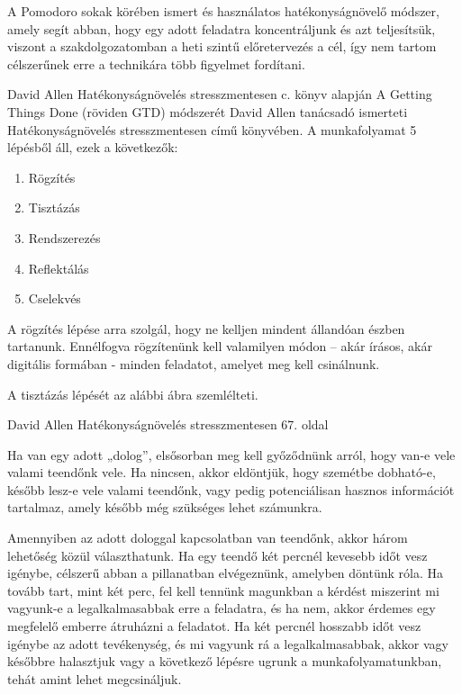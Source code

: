 A Pomodoro sokak körében ismert és használatos hatékonyságnövelő módszer, amely segít abban, hogy egy adott feladatra koncentráljunk és azt teljesítsük, viszont a szakdolgozatomban a heti szintű előretervezés a cél, így nem tartom célszerűnek erre a technikára több figyelmet fordítani.


David Allen Hatékonyságnövelés stresszmentesen c. könyv alapján
A Getting Things Done (röviden GTD) módszerét David Allen tanácsadó ismerteti Hatékonyságnövelés stresszmentesen című könyvében. A munkafolyamat 5 lépésből áll, ezek a következők:
\begin{enumerate}
\item Rögzítés
\item Tisztázás
\item Rendszerezés
\item Reflektálás
\item Cselekvés
\end{enumerate}

A rögzítés lépése arra szolgál, hogy ne kelljen mindent állandóan észben tartanunk. Ennélfogva rögzítenünk kell valamilyen módon – akár írásos, akár digitális formában - minden feladatot, amelyet meg kell csinálnunk.

A tisztázás lépését az alábbi ábra szemlélteti.


David Allen Hatékonyságnövelés stresszmentesen 67. oldal

Ha van egy adott „dolog”, elsősorban meg kell győződnünk arról, hogy van-e vele valami teendőnk vele. Ha nincsen, akkor eldöntjük, hogy szemétbe dobható-e, később lesz-e vele valami teendőnk, vagy pedig potenciálisan hasznos információt tartalmaz, amely később még szükséges lehet számunkra.

Amennyiben az adott dologgal kapcsolatban van teendőnk, akkor három lehetőség közül választhatunk. Ha egy teendő két percnél kevesebb időt vesz igénybe, célszerű abban a pillanatban elvégeznünk, amelyben döntünk róla. Ha tovább tart, mint két perc, fel kell tennünk magunkban a kérdést miszerint mi vagyunk-e a legalkalmasabbak erre a feladatra, és ha nem, akkor érdemes egy megfelelő emberre átruházni a feladatot. Ha két percnél hosszabb időt vesz igénybe az adott tevékenység, és mi vagyunk rá a legalkalmasabbak, akkor vagy későbbre halasztjuk vagy a következő lépésre ugrunk a munkafolyamatunkban, tehát amint lehet megcsináljuk.

